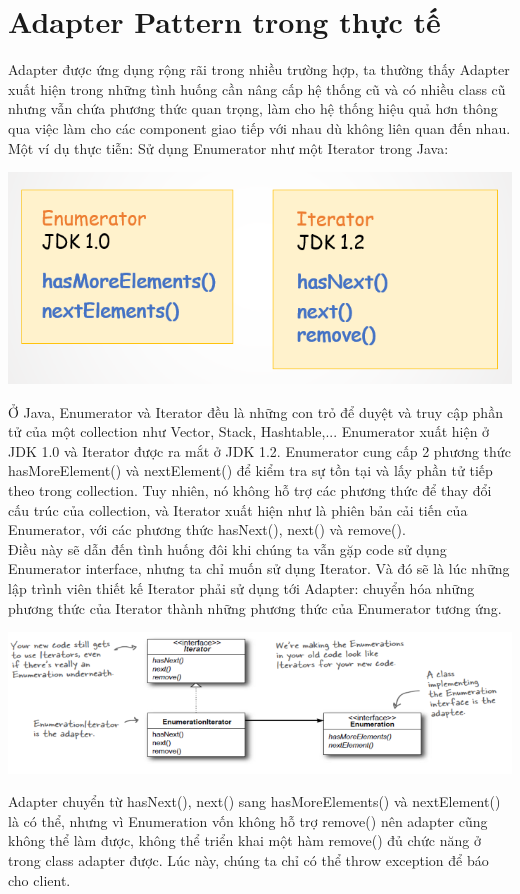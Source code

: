 \section{Adapter Pattern trong thực tế}
Adapter được ứng dụng rộng rãi trong nhiều trường hợp, ta thường thấy Adapter xuất hiện trong những tình huống cần nâng cấp hệ thống cũ và có nhiều class cũ nhưng vẫn chứa phương thức quan trọng, làm cho hệ thống hiệu quả hơn thông qua việc làm cho các component giao tiếp với nhau dù không liên quan đến nhau. Một ví dụ thực tiễn: Sử dụng Enumerator như một Iterator trong Java:\\
\begin{center}
\includegraphics{GALLEYS/images/chapter6/example1}\\
\end{center}
Ở Java, Enumerator và Iterator đều là những con trỏ để duyệt và truy cập phần tử của một collection như Vector, Stack, Hashtable,... Enumerator xuất hiện ở JDK 1.0 và Iterator được ra mắt ở JDK 1.2. Enumerator cung cấp 2 phương thức hasMoreElement() và nextElement() để kiểm tra sự tồn tại và lấy phần tử tiếp theo trong collection. Tuy nhiên, nó không hỗ trợ các phương thức để thay đổi cấu trúc của collection, và Iterator xuất hiện như là phiên bản cải tiến của Enumerator, với các phương thức hasNext(), next() và remove().\\
Điều này sẽ dẫn đến tình huống đôi khi chúng ta vẫn gặp code sử dụng Enumerator interface, nhưng ta chỉ muốn sử dụng Iterator. Và đó sẽ là lúc những lập trình viên thiết kế Iterator phải sử dụng tới Adapter: chuyển hóa những phương thức của Iterator thành những phương thức của Enumerator tương ứng.\\
\begin{center}
\includegraphics{GALLEYS/images/chapter6/example2}\\
\end{center}
Adapter chuyển từ hasNext(), next() sang hasMoreElements() và nextElement() là có thể, nhưng vì Enumeration vốn không hỗ trợ remove() nên adapter cũng không thể làm được, không thể triển khai một hàm remove() đủ chức năng ở trong class adapter được. Lúc này, chúng ta chỉ có thể throw exception để báo cho client.

